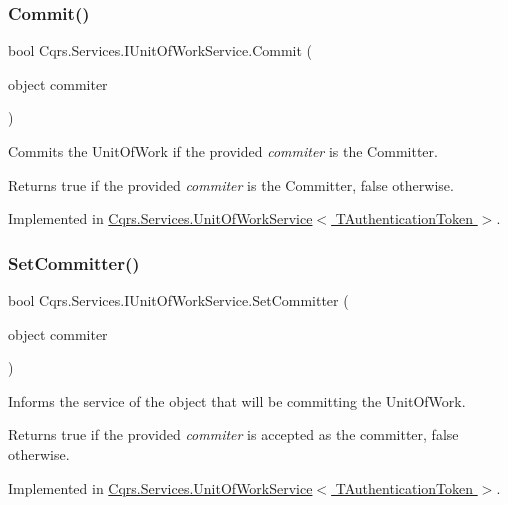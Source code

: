 \subsubsection{\texorpdfstring{Commit()}{Commit()}}
{\footnotesize\ttfamily bool Cqrs.\+Services.\+I\+Unit\+Of\+Work\+Service.\+Commit (\begin{DoxyParamCaption}\item[{object}]{commiter }\end{DoxyParamCaption})}



Commits the Unit\+Of\+Work if the provided {\itshape commiter}  is the Committer. 

\begin{DoxyReturn}{Returns}
true if the provided {\itshape commiter}  is the Committer, false otherwise. 
\end{DoxyReturn}


Implemented in \hyperlink{classCqrs_1_1Services_1_1UnitOfWorkService_a3291740821150ecea174820ed27ee56c}{Cqrs.\+Services.\+Unit\+Of\+Work\+Service$<$ T\+Authentication\+Token $>$}.

\mbox{\label{interfaceCqrs_1_1Services_1_1IUnitOfWorkService_a54f241cd90bbebf9cc73d5a296ed593b}} 
\subsubsection{\texorpdfstring{Set\+Committer()}{SetCommitter()}}
{\footnotesize\ttfamily bool Cqrs.\+Services.\+I\+Unit\+Of\+Work\+Service.\+Set\+Committer (\begin{DoxyParamCaption}\item[{object}]{commiter }\end{DoxyParamCaption})}



Informs the service of the object that will be committing the Unit\+Of\+Work. 

\begin{DoxyReturn}{Returns}
true if the provided {\itshape commiter}  is accepted as the committer, false otherwise. 
\end{DoxyReturn}


Implemented in \hyperlink{classCqrs_1_1Services_1_1UnitOfWorkService_a663471bc62f79df22c800ad683a27f59}{Cqrs.\+Services.\+Unit\+Of\+Work\+Service$<$ T\+Authentication\+Token $>$}.

